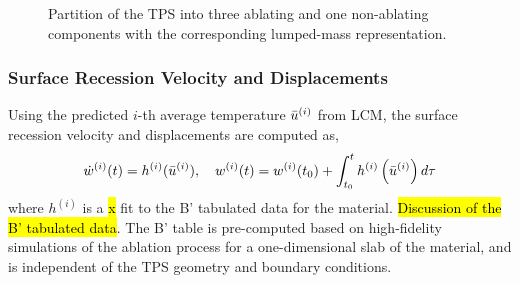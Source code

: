 \begin{figure}
    \centering
    \caption{Partition of the TPS into three ablating and one non-ablating components with the corresponding lumped-mass representation.}
    \label{fig_four_components}
\end{figure}

\subsubsection{Surface Recession Velocity and Displacements}
Using the predicted $i$-th average temperature $\bar{u}^{(i)}$ from LCM, the surface recession velocity and displacements are computed as,
\begin{equation}
    \dot{w}^{(i)}(t) = h^{(i)}(\bar{u}^{(i)}),\quad w^{(i)}(t) = w^{(i)}(t_0) + \int_{t_0}^{t} h^{(i)}\left(\bar{u}^{(i)}\right)d\tau
\end{equation}
where $h^{(i)}$ is a \hl{x} fit to the B' tabulated data for the material. \hl{Discussion of the B' tabulated data}. The B' table is pre-computed based on high-fidelity simulations of the ablation process for a one-dimensional slab of the material, and is independent of the TPS geometry and boundary conditions.

